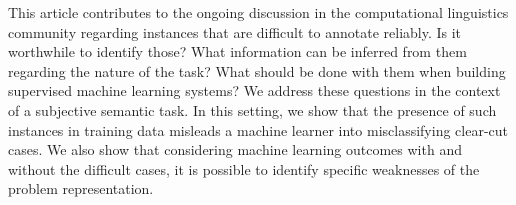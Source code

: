 This article contributes to the ongoing discussion in the computational linguistics community regarding instances that are difficult to annotate reliably. Is it worthwhile to identify those? What information can be inferred from them regarding the nature of the task? What should be done with them when building supervised machine learning systems? We address these questions in the context of a subjective semantic task. In this setting, we show that the presence of such instances in training data misleads a machine learner into misclassifying clear-cut cases.  We also show that considering machine learning outcomes with and without the difficult cases, it is possible to identify specific weaknesses of the problem representation.
